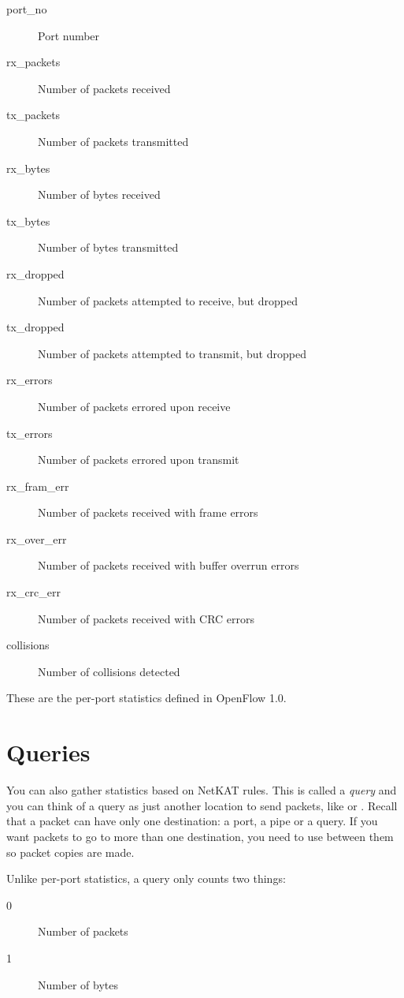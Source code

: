 \begin{description}
\item[port\_no] Port number  
\item[rx\_packets] Number of packets received  
\item[tx\_packets] Number of packets transmitted  
\item[rx\_bytes] Number of bytes received  
\item[tx\_bytes] Number of bytes transmitted  
\item[rx\_dropped] Number of packets attempted to receive, but dropped  
\item[tx\_dropped] Number of packets attempted to transmit, but dropped
\item[rx\_errors] Number of packets errored upon receive 
\item[tx\_errors] Number of packets errored upon transmit
\item[rx\_fram\_err] Number of packets received with frame errors
\item[rx\_over\_err] Number of packets received with buffer overrun errors
\item[rx\_crc\_err] Number of packets received with CRC errors
\item[collisions] Number of collisions detected
\end{description}

These are the per-port statistics defined in OpenFlow 1.0.  

\section{Queries}
\label{statistics:queries}

You can also gather statistics based on NetKAT rules.  This is called a \emph{query} and you can think 
of a query as just another location to send packets, like  or .
Recall that a packet can have only one destination: a port, a pipe or a 
query.  If you want packets to go to more than one destination, you need to use  between
them so packet copies are made.

Unlike per-port statistics, a query only counts two things:

\begin{description}
\item[0] Number of packets  
\item[1] Number of bytes  
\end{description}

